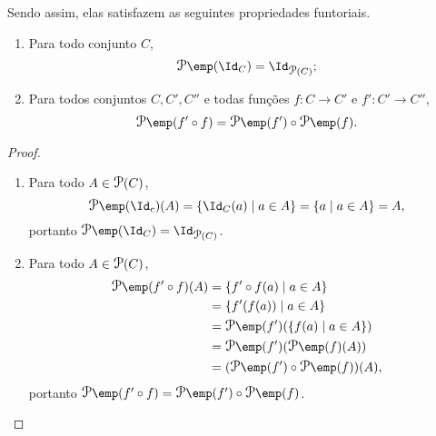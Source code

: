 Sendo assim, elas satisfazem as seguintes propriedades funtoriais.

\begin{prop}
	\begin{enumerate}
	\item Para todo conjunto $C$,
		\begin{equation*}
		\p\emp(\Id_C) = \Id_{\begin{footnotesize}\p\end{footnotesize}(C)};
		\end{equation*}
	\item Para todos conjuntos $C,C',C''$ e todas funções $f\colon C \to C'$ e $f'\colon C' \to C''$,
		\begin{equation*}
		\p\emp(f' \circ f) = \p\emp(f') \circ \p\emp(f).
		\end{equation*}
	\end{enumerate}
\end{prop}
\begin{proof}
	\begin{enumerate}
	\item Para todo $A \in \p(C)$,
		\begin{equation*}
		\p\emp(\Id_c)(A) = \set{\Id_C(a)}{a \in A} = \set{a}{a \in A} = A,
		\end{equation*}
portanto $\p\emp(\Id_C) = \Id_{\begin{footnotesize}\p\end{footnotesize}(C)}$.

	\item Para todo $A \in \p(C)$,
		\begin{align*}
		\p\emp(f' \circ f)(A) &= \set{f' \circ f(a)}{a \in A} \\
			&= \set{f'(f(a))}{a \in A} \\
			&= \p\emp(f')(\set{f(a)}{a \in A}) \\
			&= \p\emp(f')(\p\emp(f)(A)) \\
			&= (\p\emp(f') \circ \p\emp(f))(A),
		\end{align*}
portanto $\p\emp(f' \circ f) = \p\emp(f') \circ \p\emp(f)$.
	\end{enumerate}
\end{proof}

